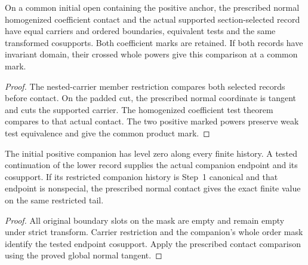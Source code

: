 \begin{theorem}
\label{hir:g1-initial-selected-normal-section-test-class}
\leanok
On a common initial open containing the positive anchor, the
prescribed normal homogenized coefficient contact and the actual
supported section-selected record have equal carriers and ordered
boundaries, equivalent tests and the same transformed cosupports.
Both coefficient marks are retained. If both records have invariant
domain, their crossed whole powers give this comparison at a common
mark.
\end{theorem}
\begin{proof}
The nested-carrier member restriction compares both selected
records before contact. On the padded cut, the prescribed normal
coordinate is tangent and cuts the supported carrier. The
homogenized coefficient test theorem compares to that actual contact.
The two positive marked powers preserve weak test equivalence and
give the common product mark.
\end{proof}

\begin{theorem}
\label{hir:g1-initial-selected-zero-history-contact}
\leanok
The initial positive companion has level zero along every finite
history. A tested continuation of the lower record supplies the
actual companion endpoint and its cosupport. If its restricted
companion history is Step~1 canonical and that endpoint is
nonspecial, the prescribed normal contact gives the exact finite
value on the same restricted tail.
\end{theorem}
\begin{proof}
All original boundary slots on the mask are empty and remain empty
under strict transform. Carrier restriction and the companion's
whole order mask identify the tested endpoint cosupport. Apply the
prescribed contact comparison using the proved global normal tangent.
\end{proof}

